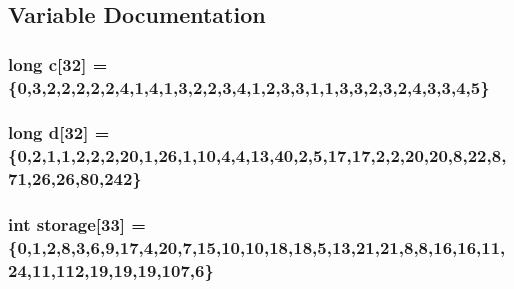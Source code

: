 \subsection{Variable Documentation}
\hypertarget{SphereCollatz_8c_09_09_a9160a09deb1711108372467e0f49b551}{
\subsubsection[{c}]{\setlength{\rightskip}{0pt plus 5cm}long c\mbox{[}32\mbox{]} = \{0,3,2,2,2,2,2,4,1,4,1,3,2,2,3,4,1,2,3,3,1,1,3,3,2,3,2,4,3,3,4,5\}}}\label{SphereCollatz_8c_09_09_a9160a09deb1711108372467e0f49b551}
\hypertarget{SphereCollatz_8c_09_09_a12b98f69417e4e2643b390e987acddcb}{
\subsubsection[{d}]{\setlength{\rightskip}{0pt plus 5cm}long d\mbox{[}32\mbox{]} = \{0,2,1,1,2,2,2,20,1,26,1,10,4,4,13,40,2,5,17,17,2,2,20,20,8,22,8,71,26,26,80,242\}}}\label{SphereCollatz_8c_09_09_a12b98f69417e4e2643b390e987acddcb}
\hypertarget{SphereCollatz_8c_09_09_abf138feaaa93a33fa911a7f64e7ac902}{
\subsubsection[{storage}]{\setlength{\rightskip}{0pt plus 5cm}int storage\mbox{[}33\mbox{]} = \{0,1,2,8,3,6,9,17,4,20,7,15,10,10,18,18,5,13,21,21,8,8,16,16,11,24,11,112,19,19,19,107,6\}}}\label{SphereCollatz_8c_09_09_abf138feaaa93a33fa911a7f64e7ac902}
